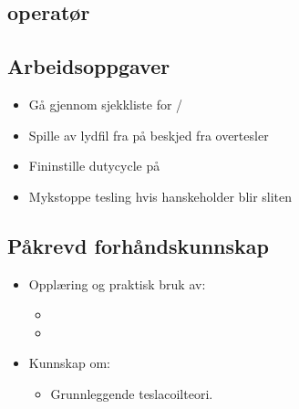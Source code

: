 \subsection{\Pulsformer operatør}

\subsection*{Arbeidsoppgaver}
\begin{itemize}
\item{Gå gjennom sjekkliste for \signalkilde/\pulsformer}
\item{Spille av lydfil fra \signalkilde { }på beskjed fra overtesler}
\item{Fininstille dutycycle på \pulsformer}
\item{Mykstoppe tesling hvis hanskeholder blir sliten}
\end{itemize}


\subsection*{Påkrevd forhåndskunnskap}
\begin{itemize}
\item{Opplæring og praktisk bruk av:}
\begin{itemize}
\item{\Signalkilde}
\item{\Pulsformer}
\iftoggle{INTERN}{
    \item{Hanske}
}{
}
\end{itemize}
\item{Kunnskap om:}
\begin{itemize}
\item{Grunnleggende teslacoilteori.}
\end{itemize}
\end{itemize}